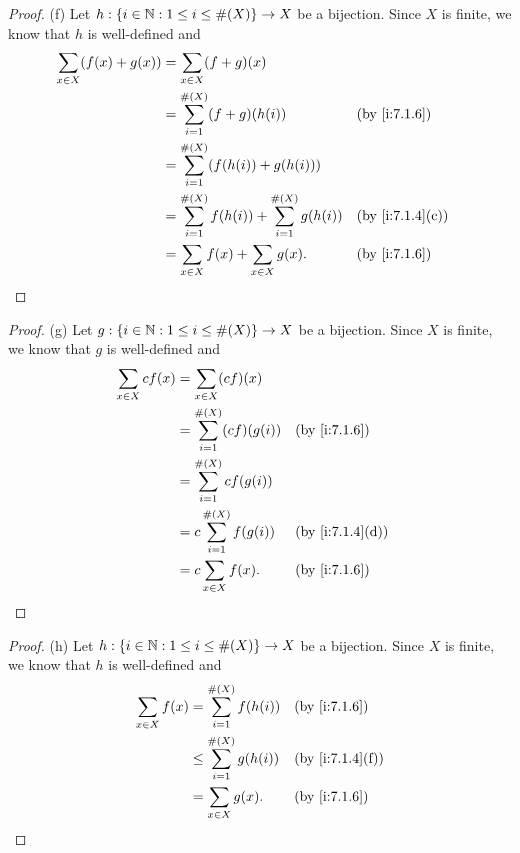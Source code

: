 \begin{proof}{(f)}
  Let \(h : \left\lbrace i \in \mathbb{N} : 1 \leq i \leq \#(X)\right\rbrace \to X\) be a bijection.
  Since \(X\) is finite, we know that \(h\) is well-defined and
  \begin{align*}
    \sum_{x \in X} (f(x) + g(x)) & = \sum_{x \in X} (f + g)(x)                                                        \\
                                 & = \sum_{i = 1}^{\#(X)} (f + g)(h(i))                          &  & \by{i:7.1.6}    \\
                                 & = \sum_{i = 1}^{\#(X)} (f(h(i)) + g(h(i)))                                         \\
                                 & = \sum_{i = 1}^{\#(X)} f(h(i)) + \sum_{i = 1}^{\#(X)} g(h(i)) &  & \by{i:7.1.4}[c] \\
                                 & = \sum_{x \in X} f(x) + \sum_{x \in X} g(x).                  &  & \by{i:7.1.6}
  \end{align*}
\end{proof}

\begin{proof}{(g)}
  Let \(g : \left\lbrace i \in \mathbb{N} : 1 \leq i \leq \#(X)\right\rbrace \to X\) be a bijection.
  Since \(X\) is finite, we know that \(g\) is well-defined and
  \begin{align*}
    \sum_{x \in X} cf(x) & = \sum_{x \in X} (cf)(x)                               \\
                         & = \sum_{i = 1}^{\#(X)} (cf)(g(i)) &  & \by{i:7.1.6}    \\
                         & = \sum_{i = 1}^{\#(X)} cf(g(i))                        \\
                         & = c \sum_{i = 1}^{\#(X)} f(g(i))  &  & \by{i:7.1.4}[d] \\
                         & = c \sum_{x \in X} f(x).          &  & \by{i:7.1.6}
  \end{align*}
\end{proof}

\begin{proof}{(h)}
  Let \(h : \left\lbrace i \in \mathbb{N} : 1 \leq i \leq \#(X)\right\rbrace \to X\) be a bijection.
  Since \(X\) is finite, we know that \(h\) is well-defined and
  \begin{align*}
    \sum_{x \in X} f(x) & = \sum_{i = 1}^{\#(X)} f(h(i))    &  & \by{i:7.1.6}    \\
                        & \leq \sum_{i = 1}^{\#(X)} g(h(i)) &  & \by{i:7.1.4}[f] \\
                        & = \sum_{x \in X} g(x).            &  & \by{i:7.1.6}
  \end{align*}
\end{proof}


